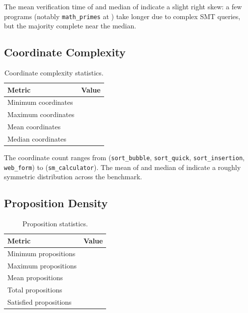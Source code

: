 \documentclass[11pt]{article}
\begin{document}
The mean verification time of \expTimeMean{} and median of
\expTimeMedian{} indicate a slight right skew: a few programs
(notably \texttt{math\_primes} at \expTimeMax{}) take longer due
to complex SMT queries, but the majority complete near the median.

\subsection{Coordinate Complexity}

\begin{table}[H]
\centering
\caption{Coordinate complexity statistics.}\label{tab:coords}
\begin{tabular}{@{}l r@{}}
\toprule
\textbf{Metric} & \textbf{Value} \\
\midrule
Minimum coordinates & \expCoordsMin{} \\
Maximum coordinates & \expCoordsMax{} \\
Mean coordinates    & \expCoordsMean{} \\
Median coordinates  & \expCoordsMedian{} \\
\bottomrule
\end{tabular}
\end{table}

The coordinate count ranges from \expCoordsMin{}
(\texttt{sort\_bubble}, \texttt{sort\_quick}, \texttt{sort\_insertion},
\texttt{web\_form}) to \expCoordsMax{} (\texttt{sm\_calculator}).
The mean of \expCoordsMean{} and median of \expCoordsMedian{}
indicate a roughly symmetric distribution across the benchmark.

\subsection{Proposition Density}

\begin{table}[H]
\centering
\caption{Proposition statistics.}\label{tab:props}
\begin{tabular}{@{}l r@{}}
\toprule
\textbf{Metric} & \textbf{Value} \\
\midrule
Minimum propositions  & \expPropsMin{} \\
Maximum propositions  & \expPropsMax{} \\
Mean propositions     & \expPropsMean{} \\
Total propositions    & \expPropsSum{} \\
Satisfied propositions& \expPropsOkSum{} \\
\bottomrule
\end{tabular}
\end{table}
\end{document}
